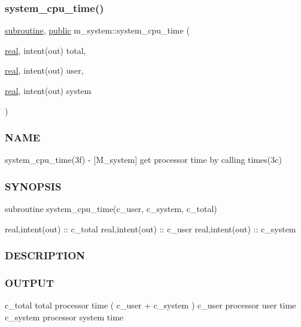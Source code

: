 \subsubsection{\texorpdfstring{system\+\_\+cpu\+\_\+time()}{system\_cpu\_time()}}
{\footnotesize\ttfamily \hyperlink{M__stopwatch_83_8txt_acfbcff50169d691ff02d4a123ed70482}{subroutine}, \hyperlink{M__stopwatch_83_8txt_a2f74811300c361e53b430611a7d1769f}{public} m\+\_\+system\+::system\+\_\+cpu\+\_\+time (\begin{DoxyParamCaption}\item[{\hyperlink{read__watch_83_8txt_abdb62bde002f38ef75f810d3a905a823}{real}, intent(out)}]{total,  }\item[{\hyperlink{read__watch_83_8txt_abdb62bde002f38ef75f810d3a905a823}{real}, intent(out)}]{user,  }\item[{\hyperlink{read__watch_83_8txt_abdb62bde002f38ef75f810d3a905a823}{real}, intent(out)}]{system }\end{DoxyParamCaption})}



\subsubsection*{N\+A\+ME}

system\+\_\+cpu\+\_\+time(3f) -\/ \mbox{[}M\+\_\+system\mbox{]} get processor time by calling times(3c) 

\subsubsection*{S\+Y\+N\+O\+P\+S\+IS}

\begin{DoxyVerb}    subroutine system_cpu_time(c_user, c_system, c_total)

     real,intent(out) :: c_total
     real,intent(out) :: c_user
     real,intent(out) :: c_system
\end{DoxyVerb}


\subsubsection*{D\+E\+S\+C\+R\+I\+P\+T\+I\+ON}

\subsubsection*{O\+U\+T\+P\+UT}

c\+\_\+total total processor time ( c\+\_\+user + c\+\_\+system ) c\+\_\+user processor user time c\+\_\+system processor system time

